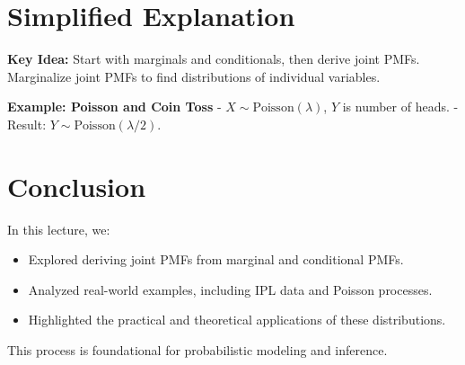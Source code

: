 \documentclass{article}
\begin{document}
\section*{Simplified Explanation}

\textbf{Key Idea:}
Start with marginals and conditionals, then derive joint PMFs. Marginalize joint PMFs to find distributions of individual variables.

\textbf{Example: Poisson and Coin Toss}
- $X \sim \text{Poisson}(\lambda)$, $Y$ is number of heads.
- Result: $Y \sim \text{Poisson}(\lambda / 2)$.

\section*{Conclusion}

In this lecture, we:
\begin{itemize}
  \item Explored deriving joint PMFs from marginal and conditional PMFs.
  \item Analyzed real-world examples, including IPL data and Poisson processes.
  \item Highlighted the practical and theoretical applications of these distributions.
\end{itemize}

This process is foundational for probabilistic modeling and inference.
\end{document}
